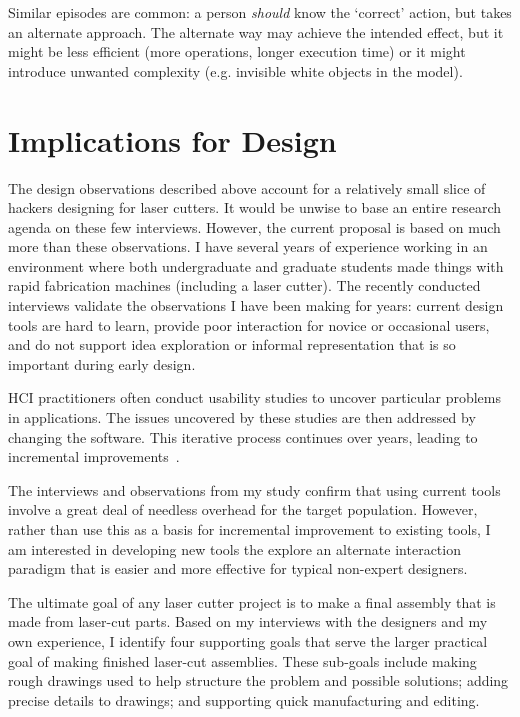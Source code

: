 \documentclass[12pt]{article}
\begin{document}
Similar episodes are common: a person \textit{should} know the
`correct' action, but takes an alternate approach. The alternate way
may achieve the intended effect, but it might be less efficient (more
operations, longer execution time) or it might introduce unwanted
complexity (e.g. invisible white objects in the model).

\section{Implications for Design}

The design observations described above account for a relatively small
slice of hackers designing for laser cutters. It would be unwise to
base an entire research agenda on these few interviews. However, the
current proposal is based on much more than these observations. I have
several years of experience working in an environment where both
undergraduate and graduate students made things with rapid fabrication
machines (including a laser cutter). The recently conducted interviews
validate the observations I have been making for years: current design
tools are hard to learn, provide poor interaction for novice or
occasional users, and do not support idea exploration or informal
representation that is so important during early design.

HCI practitioners often conduct usability studies to uncover
particular problems in applications. The issues uncovered by these
studies are then addressed by changing the software. This iterative
process continues over years, leading to incremental
improvements~\cite{buxton-sketching}.

The interviews and observations from my study confirm that using
current tools involve a great deal of needless overhead for the target
population. However, rather than use this as a basis for incremental
improvement to existing tools, I am interested in developing new tools
the explore an alternate interaction paradigm that is easier and more
effective for typical non-expert designers.

The ultimate goal of any laser cutter project is to make a final
assembly that is made from laser-cut parts. Based on my interviews
with the designers and my own experience, I identify four supporting
goals that serve the larger practical goal of making finished
laser-cut assemblies. These sub-goals include making rough drawings
used to help structure the problem and possible solutions; adding
precise details to drawings; and supporting quick manufacturing and
editing.
\end{document}
